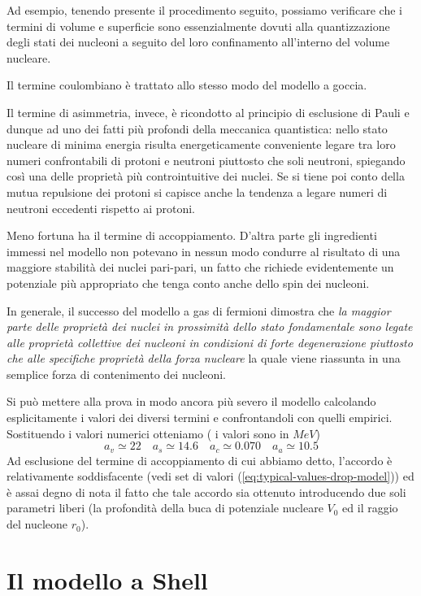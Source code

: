 Ad esempio, tenendo presente il procedimento seguito, possiamo verificare che i termini di volume e superficie sono essenzialmente dovuti alla quantizzazione degli stati dei nucleoni a seguito del loro confinamento all’interno del volume nucleare.

Il termine coulombiano è trattato allo stesso modo del modello a goccia.

Il termine di asimmetria, invece, è ricondotto al principio di esclusione di Pauli e dunque ad uno dei fatti più profondi della meccanica quantistica: nello stato nucleare di minima energia risulta energeticamente conveniente
legare tra loro numeri confrontabili di protoni e neutroni piuttosto che soli neutroni, spiegando così una delle proprietà più controintuitive dei nuclei.
Se si tiene poi conto della mutua repulsione dei protoni si capisce anche la tendenza a legare numeri di neutroni eccedenti rispetto ai protoni.

Meno fortuna ha il termine di accoppiamento.
D’altra parte gli ingredienti immessi nel modello non potevano in nessun modo condurre al risultato di una maggiore stabilità dei nuclei pari-pari, un fatto che richiede evidentemente un potenziale più appropriato che tenga conto anche dello spin dei nucleoni.

In generale, il successo del modello a gas di fermioni dimostra che
\emph{la maggior parte delle proprietà dei nuclei in prossimità dello stato fondamentale sono legate alle proprietà
collettive dei nucleoni in condizioni di forte degenerazione piuttosto che alle specifiche proprietà della forza nucleare}
la quale viene riassunta in una semplice forza di contenimento dei nucleoni.

Si può mettere alla prova in modo ancora più severo il modello calcolando esplicitamente i valori dei diversi termini e confrontandoli con quelli empirici.
Sostituendo i valori numerici otteniamo ( i valori sono in $MeV$)
\[
	a_v \simeq 22 \quad
	a_s \simeq 14.6 \quad
	a_c \simeq 0.070 \quad
	a_a \simeq 10.5
\]
Ad esclusione del termine di accoppiamento di cui abbiamo detto, l’accordo è relativamente soddisfacente
(vedi set di valori (\ref{eq:typical-values-drop-model})) ed è assai degno di nota il fatto che tale accordo sia
ottenuto introducendo due soli parametri liberi (la profondità della buca di potenziale nucleare $V_0$
ed il raggio del nucleone $r_0$).



\section{Il modello a Shell}\label{sec:il-modello-a-shell}


